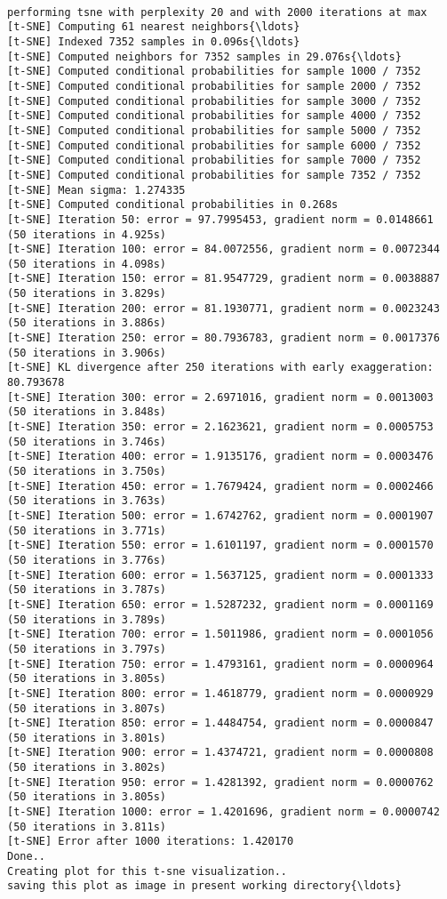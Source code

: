\documentclass[11pt]{article}
\begin{document}
    \begin{Verbatim}[commandchars=\\\{\}]

performing tsne with perplexity 20 and with 2000 iterations at max
[t-SNE] Computing 61 nearest neighbors{\ldots}
[t-SNE] Indexed 7352 samples in 0.096s{\ldots}
[t-SNE] Computed neighbors for 7352 samples in 29.076s{\ldots}
[t-SNE] Computed conditional probabilities for sample 1000 / 7352
[t-SNE] Computed conditional probabilities for sample 2000 / 7352
[t-SNE] Computed conditional probabilities for sample 3000 / 7352
[t-SNE] Computed conditional probabilities for sample 4000 / 7352
[t-SNE] Computed conditional probabilities for sample 5000 / 7352
[t-SNE] Computed conditional probabilities for sample 6000 / 7352
[t-SNE] Computed conditional probabilities for sample 7000 / 7352
[t-SNE] Computed conditional probabilities for sample 7352 / 7352
[t-SNE] Mean sigma: 1.274335
[t-SNE] Computed conditional probabilities in 0.268s
[t-SNE] Iteration 50: error = 97.7995453, gradient norm = 0.0148661 (50 iterations in 4.925s)
[t-SNE] Iteration 100: error = 84.0072556, gradient norm = 0.0072344 (50 iterations in 4.098s)
[t-SNE] Iteration 150: error = 81.9547729, gradient norm = 0.0038887 (50 iterations in 3.829s)
[t-SNE] Iteration 200: error = 81.1930771, gradient norm = 0.0023243 (50 iterations in 3.886s)
[t-SNE] Iteration 250: error = 80.7936783, gradient norm = 0.0017376 (50 iterations in 3.906s)
[t-SNE] KL divergence after 250 iterations with early exaggeration: 80.793678
[t-SNE] Iteration 300: error = 2.6971016, gradient norm = 0.0013003 (50 iterations in 3.848s)
[t-SNE] Iteration 350: error = 2.1623621, gradient norm = 0.0005753 (50 iterations in 3.746s)
[t-SNE] Iteration 400: error = 1.9135176, gradient norm = 0.0003476 (50 iterations in 3.750s)
[t-SNE] Iteration 450: error = 1.7679424, gradient norm = 0.0002466 (50 iterations in 3.763s)
[t-SNE] Iteration 500: error = 1.6742762, gradient norm = 0.0001907 (50 iterations in 3.771s)
[t-SNE] Iteration 550: error = 1.6101197, gradient norm = 0.0001570 (50 iterations in 3.776s)
[t-SNE] Iteration 600: error = 1.5637125, gradient norm = 0.0001333 (50 iterations in 3.787s)
[t-SNE] Iteration 650: error = 1.5287232, gradient norm = 0.0001169 (50 iterations in 3.789s)
[t-SNE] Iteration 700: error = 1.5011986, gradient norm = 0.0001056 (50 iterations in 3.797s)
[t-SNE] Iteration 750: error = 1.4793161, gradient norm = 0.0000964 (50 iterations in 3.805s)
[t-SNE] Iteration 800: error = 1.4618779, gradient norm = 0.0000929 (50 iterations in 3.807s)
[t-SNE] Iteration 850: error = 1.4484754, gradient norm = 0.0000847 (50 iterations in 3.801s)
[t-SNE] Iteration 900: error = 1.4374721, gradient norm = 0.0000808 (50 iterations in 3.802s)
[t-SNE] Iteration 950: error = 1.4281392, gradient norm = 0.0000762 (50 iterations in 3.805s)
[t-SNE] Iteration 1000: error = 1.4201696, gradient norm = 0.0000742 (50 iterations in 3.811s)
[t-SNE] Error after 1000 iterations: 1.420170
Done..
Creating plot for this t-sne visualization..
saving this plot as image in present working directory{\ldots}

    \end{Verbatim}
\end{document}
